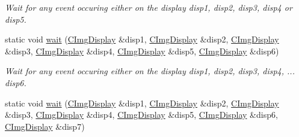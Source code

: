 \begin{DoxyCompactItemize}
\begin{DoxyCompactList}\small\item\em Wait for any event occuring either on the display {\ttfamily disp1}, {\ttfamily disp2}, {\ttfamily disp3}, {\ttfamily disp4} or {\ttfamily disp5}. \item\end{DoxyCompactList}\item 
\hypertarget{structcimg__library_1_1CImgDisplay_a2ca2604a502f006134bd159285c24d84}{
static void \hyperlink{structcimg__library_1_1CImgDisplay_a2ca2604a502f006134bd159285c24d84}{wait} (\hyperlink{structcimg__library_1_1CImgDisplay}{CImgDisplay} \&disp1, \hyperlink{structcimg__library_1_1CImgDisplay}{CImgDisplay} \&disp2, \hyperlink{structcimg__library_1_1CImgDisplay}{CImgDisplay} \&disp3, \hyperlink{structcimg__library_1_1CImgDisplay}{CImgDisplay} \&disp4, \hyperlink{structcimg__library_1_1CImgDisplay}{CImgDisplay} \&disp5, \hyperlink{structcimg__library_1_1CImgDisplay}{CImgDisplay} \&disp6)}
\label{structcimg__library_1_1CImgDisplay_a2ca2604a502f006134bd159285c24d84}

\begin{DoxyCompactList}\small\item\em Wait for any event occuring either on the display {\ttfamily disp1}, {\ttfamily disp2}, {\ttfamily disp3}, {\ttfamily disp4}, ... {\ttfamily disp6}. \item\end{DoxyCompactList}\item 
\hypertarget{structcimg__library_1_1CImgDisplay_a4e44eab5ce34cfa5872122decb31115e}{
static void \hyperlink{structcimg__library_1_1CImgDisplay_a4e44eab5ce34cfa5872122decb31115e}{wait} (\hyperlink{structcimg__library_1_1CImgDisplay}{CImgDisplay} \&disp1, \hyperlink{structcimg__library_1_1CImgDisplay}{CImgDisplay} \&disp2, \hyperlink{structcimg__library_1_1CImgDisplay}{CImgDisplay} \&disp3, \hyperlink{structcimg__library_1_1CImgDisplay}{CImgDisplay} \&disp4, \hyperlink{structcimg__library_1_1CImgDisplay}{CImgDisplay} \&disp5, \hyperlink{structcimg__library_1_1CImgDisplay}{CImgDisplay} \&disp6, \hyperlink{structcimg__library_1_1CImgDisplay}{CImgDisplay} \&disp7)}
\label{structcimg__library_1_1CImgDisplay_a4e44eab5ce34cfa5872122decb31115e}


\end{DoxyCompactItemize}
